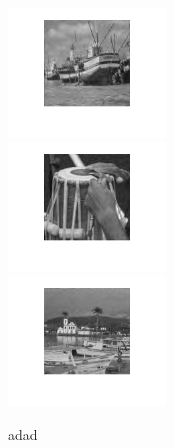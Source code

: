 \begin{figure}[htbp]
{\begin{minipage}[t]{0.33\linewidth}
        \vspace{0.02cm}
        \includegraphics[width=1.651in]{images/boat_out.png}\\
        \vspace{0.02cm}
        \includegraphics[width=1.651in]{images/pakhawaj_out.png}\\
        \vspace{0.02cm}
        \includegraphics[width=1.651in]{images/paraty_out.png}\\
    \end{minipage}%
}%
 
 
\centering
\caption{adad}
\vspace{-0.2cm}
\label{fig:compare_fig}

\end{figure}
